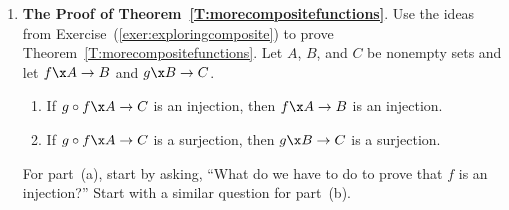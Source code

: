 \begin{enumerate}
\item \textbf{The Proof of Theorem~\ref{T:morecompositefunctions}}.  Use the ideas from 
Exercise~(\ref{exer:exploringcomposite}) to prove Theorem~\ref{T:morecompositefunctions}.  
\label{exer:morecompositefunctions1}
Let  $A$, $B$, and  $C$  be nonempty sets and let  $f\x A \to B$  and  $g\x B \to C$.  
\begin{enumerate}
\item If  $g \circ f\x A \to C$  is an injection, then  $f\x A \to B$  is an injection. \label{exer:sec64-6}


\item If  $g \circ f\x A \to C$  is a surjection, then  $g\x B \to C$  is a surjection. \label{exer:sec64-7}
\end{enumerate}

\hint For part~(a), start by asking, ``What do we have to do to prove that $f$ is an injection?''  Start with a similar question for part~(b).

\end{enumerate}


\hbreak

\endinput









\endinput
